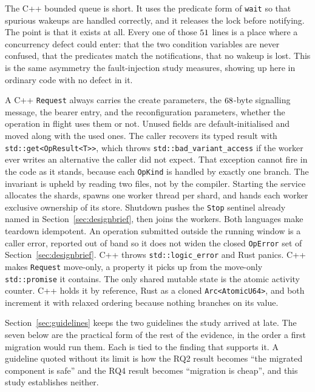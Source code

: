 \documentclass[english,oneside,a4paper,censored,csm,software-track-2020]{HYthesisML}
\begin{document}
\begin{appendices}
The C++ bounded queue is short. It uses the predicate form of \texttt{wait} so that spurious
wakeups are handled correctly, and it releases the lock before notifying. The point is that it
exists at all. Every one of those $51$ lines is a place where a concurrency
defect could enter: that the two condition variables are never confused, that the predicates
match the notifications, that no wakeup is lost. This is the same asymmetry the fault-injection
study measures, showing up here in ordinary code with no defect in it.

A C++ \texttt{Request} always carries the create parameters, the $68$-byte
signalling message, the bearer entry, and the reconfiguration parameters, whether the operation
in flight uses them or not. Unused fields are default-initialised and moved along with the used
ones. The caller recovers its typed result with \texttt{std::get<OpResult<T>>}, which throws
\texttt{std::bad\_variant\_access} if the worker ever writes an alternative the caller did not
expect. That exception cannot fire in the code as it stands, because each \texttt{OpKind} is
handled by exactly one branch. The invariant is upheld by reading two files, not by the
compiler. Starting the service allocates the shards, spawns one worker thread per shard, and
hands each worker exclusive ownership of its store. Shutdown pushes the \texttt{Stop} sentinel
already named in Section~\ref{sec:designbrief}, then joins the workers. Both languages make teardown
idempotent. An operation submitted outside the running window is a caller error, reported out of
band so it does not widen the closed \texttt{OpError} set of Section~\ref{sec:designbrief}. C++ throws
\texttt{std::logic\_error} and Rust panics. C++ makes \texttt{Request} move-only, a property it
picks up from the move-only \texttt{std::promise} it contains. The only shared mutable state is
the atomic activity counter. C++ holds it by reference, Rust as a cloned
\texttt{Arc<AtomicU64>}, and both increment it with relaxed ordering because nothing branches on
its value.

Section~\ref{sec:guidelines} keeps the two guidelines the study arrived at late. The seven
below are the practical form of the rest of the evidence, in the order a first migration would
run them. Each is tied to the finding that supports it. A guideline quoted without its limit is
how the RQ2 result becomes ``the migrated component is safe'' and the RQ4 result becomes
``migration is cheap'', and this study establishes neither.


\end{appendices}
\end{document}
